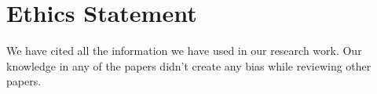 \section*{Ethics Statement}
We have cited all the information we have used in our research work. Our knowledge in any of the papers didn't create any bias while reviewing other papers.
\pagebreak